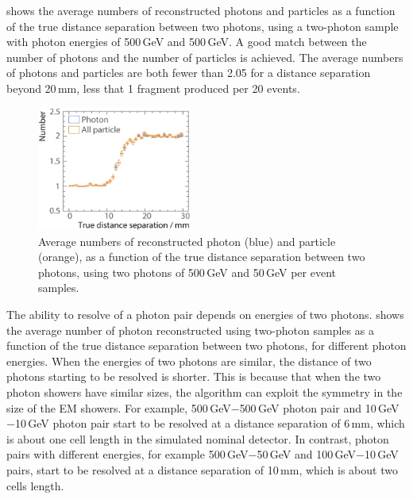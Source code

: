  shows  the average numbers of reconstructed photons and particles  as a function of the true distance separation between two photons, using a two-photon sample with photon energies of  500\,GeV and 500\,GeV. A good match between the number of photons and the number of particles is achieved. The average numbers of photons and particles are  both fewer than 2.05 for a distance separation beyond 20\,mm, less that 1 fragment produced per 20 events.



\begin{figure}[tbph]
\centering
        \includegraphics[width=0.45\textwidth]{photon/DoubleN_pN_all3}
        \caption{Average numbers of reconstructed photon  (blue) and particle (orange), as a function of the true distance separation between two photons, using two photons of 500\,GeV and 50\,GeV per event samples. }
        \label{fig:photonDoubleCompareN_pN_all}
\end{figure}

The ability to  resolve of a photon pair depends on energies of two photons.  shows the average number of photon reconstructed using two-photon samples as a function of the true distance separation between two photons, for different photon energies. When the energies of two photons are similar, the distance of two photons starting to be resolved is shorter. This is because that when the two photon showers have similar sizes, the \peakFinding algorithm can exploit the symmetry in the size of the EM showers. For example, 500\,GeV$-$500\,GeV photon pair and 10\,GeV$-$10\,GeV photon pair start to be resolved at a distance separation of 6\,mm, which is about one \ECAL cell length in the simulated nominal \ILD detector. In contrast, photon pairs with different energies, for example 500\,GeV$-$50\,GeV and  100\,GeV$-$10\,GeV pairs, start to be resolved at a distance separation of 10\,mm, which is about two \ECAL cells length.

